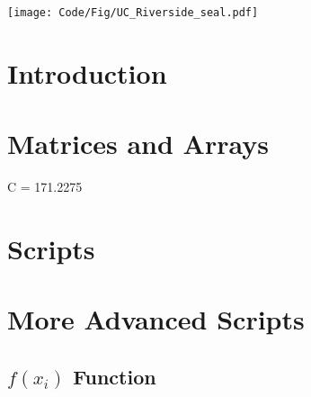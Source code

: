 \documentclass[12pt]{article}
\begin{document}
\begin{titlepage}
		\newcommand*{\plogo}{\texttt{[image: Code/Fig/UC\_Riverside\_seal.pdf]}}
		
		\plogo\\[1cm] %
		
		
		\vfill %
	\end{titlepage}
	
	\newpage
	
	\tableofcontents
	\pagebreak
	\listoffigures
	\lstlistoflistings  
	\pagebreak
	
	
	\section{Introduction}
		
	\section{Matrices and Arrays}
		
		C = 171.2275
	\section{Scripts}
		
		
	\section{More Advanced Scripts}
		\subsection{$f(x_{i})$ Function}
			
\end{document}
